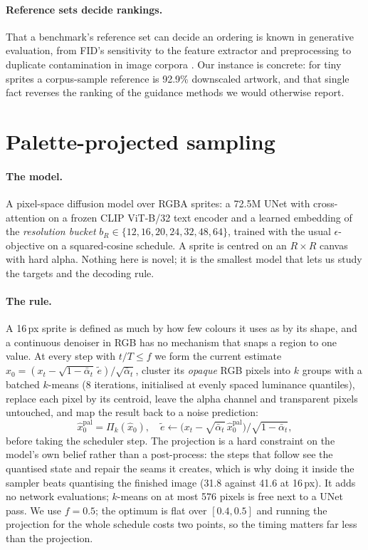\documentclass[10pt,twocolumn,letterpaper]{article}
\begin{document}
\paragraph{Reference sets decide rankings.}
That a benchmark's reference set can decide an ordering is known in generative evaluation, from FID's sensitivity to
the feature extractor and preprocessing \cite{Parmar2022,Stein2023} to duplicate contamination in image corpora
\cite{Barz2020,Webster2023}. Our instance is concrete: for tiny sprites a corpus-sample reference is 92.9\% downscaled
artwork, and that single fact reverses the ranking of the guidance methods we would otherwise report.

\section{Palette-projected sampling}
\label{sec:method}

\paragraph{The model.}
A pixel-space diffusion model over RGBA sprites: a 72.5M UNet with cross-attention on a frozen CLIP ViT-B/32 text
encoder and a learned embedding of the \emph{resolution bucket} $b_R \in \{12,16,20,24,32,48,64\}$, trained with the
usual $\epsilon$-objective on a squared-cosine schedule. A sprite is centred on an $R \times R$ canvas with hard alpha.
Nothing here is novel; it is the smallest model that lets us study the targets and the decoding rule.

\paragraph{The rule.}
A 16\,px sprite is defined as much by how few colours it uses as by its shape, and a continuous denoiser in RGB has no
mechanism that snaps a region to one value. At every step with $t/T \le f$ we form the current estimate
$\hat x_0 = (x_t - \sqrt{1-\bar\alpha_t}\,\tilde e)/\sqrt{\bar\alpha_t}$, cluster its \emph{opaque} RGB pixels into $k$
groups with a batched $k$-means (8 iterations, initialised at evenly spaced luminance quantiles), replace each pixel by
its centroid, leave the alpha channel and transparent pixels untouched, and map the result back to a noise prediction:
\begin{equation}
  \hat x_0^{\text{pal}} = \Pi_k(\hat x_0), \quad
  \tilde e \leftarrow \bigl(x_t - \sqrt{\bar\alpha_t}\,\hat x_0^{\text{pal}}\bigr) / \sqrt{1-\bar\alpha_t},
  \label{eq:palette}
\end{equation}
before taking the scheduler step. The projection is a hard constraint on the model's own belief rather than a
post-process: the steps that follow see the quantised state and repair the seams it creates, which is why doing it
inside the sampler beats quantising the finished image (31.8 against 41.6 at 16\,px). It adds no network evaluations;
$k$-means on at most 576 pixels is free next to a UNet pass. We use $f = 0.5$; the optimum is flat over $[0.4, 0.5]$
and running the projection for the whole schedule costs two points, so the timing matters far less than the projection.
\end{document}
